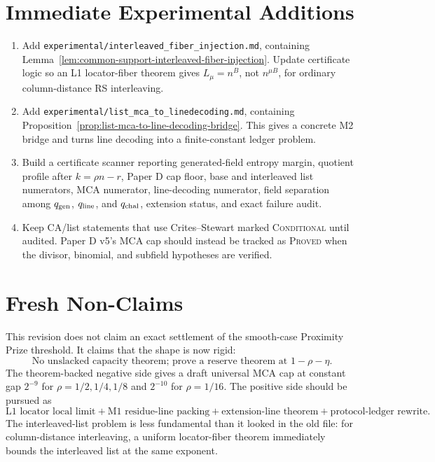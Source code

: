 \documentclass[11pt]{article}
\newcommand{\qline}{q_{\rm line}}
\newcommand{\qgen}{q_{\rm gen}}
\newcommand{\qchal}{q_{\rm chal}}
\begin{document}
\section{Immediate Experimental Additions}
\label{sec:immediate-experimental-additions}

\begin{enumerate}
\item Add \texttt{experimental/interleaved\_fiber\_injection.md}, containing
Lemma~\ref{lem:common-support-interleaved-fiber-injection}.  Update certificate
logic so an L1 locator-fiber theorem gives \(L_\mu=n^B\), not \(n^{\mu B}\), for
ordinary column-distance RS interleaving.

\item Add \texttt{experimental/list\_mca\_to\_linedecoding.md}, containing
Proposition~\ref{prop:list-mca-to-line-decoding-bridge}.  This gives a concrete
M2 bridge and turns line decoding into a finite-constant ledger problem.

\item Build a certificate scanner reporting generated-field entropy margin,
quotient profile after \(k=\rho n-r\), Paper D cap floor, base and interleaved
list numerators, MCA numerator, line-decoding numerator, field separation among
\(\qgen\), \(\qline\), and \(\qchal\), extension status, and exact failure audit.

\item Keep CA/list statements that use Crites--Stewart marked
\textsc{Conditional} until audited.  Paper D v5's MCA cap should instead be
tracked as \textsc{Proved} when the divisor, binomial, and subfield hypotheses
are verified.
\end{enumerate}

\section{Fresh Non-Claims}
\label{sec:fresh-nonclaims}

This revision does not claim an exact settlement of the smooth-case Proximity
Prize threshold.  It claims that the shape is now rigid:
\[
  \boxed{\text{No unslacked capacity theorem; prove a reserve theorem at }
  1-\rho-\eta.}
\]
The theorem-backed negative side gives a draft universal MCA cap at constant gap
\(2^{-9}\) for \(\rho=1/2,1/4,1/8\) and \(2^{-10}\) for \(\rho=1/16\).  The
positive side should be pursued as
\[
  \text{L1 locator local limit}
  +\text{M1 residue-line packing}
  +\text{extension-line theorem}
  +\text{protocol-ledger rewrite}.
\]
The interleaved-list problem is less fundamental than it looked in the old file:
for column-distance interleaving, a uniform locator-fiber theorem immediately
bounds the interleaved list at the same exponent.
\end{document}
